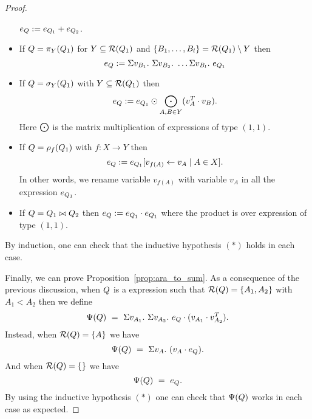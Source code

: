 \begin{proof}
\begin{itemize}
	$e_{Q}:=e_{Q_1} + e_{Q_2}$.
	\item If $Q=\pi_{Y}(Q_1)$ for $Y\subseteq \mathcal{R}(Q_1)$ and $\{B_1, \ldots, B_l\} = \mathcal{R}(Q_1) \setminus Y$ then
	$$
	\earae:= \Sigma v_{B_1}. \ \Sigma v_{B_2}. \ \ldots \Sigma v_{B_l}. \ e_{\arae_1}
	$$
	\item If $Q=\sigma_{Y}(Q_1)$ with $Y\subseteq\mathcal{R}(Q_1)$ then
	$$
	e_{Q}:=e_{Q_1} \odot \bigodot_{A,B\in Y} (v_{A}^T \cdot v_{B}).
	$$
	Here $\bigodot$ is the matrix multiplication of expressions of type $(1,1)$.
	\item If $Q=\rho_{f}(Q_1)$ with $f: X \rightarrow Y$ then
	$$e_{Q}:=e_{Q_1}[v_{f(A)} \gets v_A\mid A\in X].$$
	In other words, we rename variable $v_{f(A)}$ with variable $v_A$ in all the expression $e_{Q_1}$. 
	\item If $Q=Q_1\bowtie Q_2$ then
	$e_{Q}:=e_{Q_1} \cdot e_{Q_1}$ where the product is over expression of type $(1,1)$.
\end{itemize}
By induction, one can check that the inductive hypothesis $(*)$ holds in each case. 

Finally, we can prove Proposition~\ref{prop:ara_to_sum}.
As a consequence of the previous discussion, when $Q$ is a \rak expression 
such that $\mathcal{R}(Q)=\{A_1,A_2\}$ with $A_1<A_2$ then we define
$$
\Psi(Q) \ = \ \Sigma v_{A_1}. \ \Sigma v_{A_2}. \ e_{Q} \cdot (v_{A_1} \cdot v_{A_2}^T). 
$$
Instead, when $\mathcal{R}(Q)=\{A\}$ we have
$$
\Psi(Q) \ = \ \Sigma v_{A}. \  (v_{A} \cdot e_{Q}). 
$$
And when $\mathcal{R}(Q)=\{\}$ we have
$$
\Psi(Q) \ = \ e_{Q}.
$$
By using the inductive hypothesis $(*)$ one can check that $\Psi(Q)$ works in each case as expected. 
\end{proof}
 